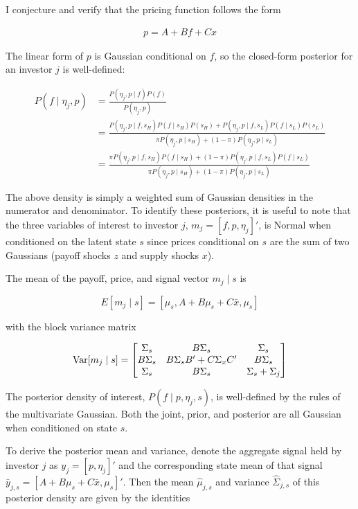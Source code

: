 \documentclass{article}
\begin{document}
I conjecture and verify that the pricing function follows the form

\begin{align}
    p = A + B f + C x
\end{align}

\noindent The linear form of $p$ is Gaussian conditional on $f$, so the closed-form posterior for an investor $j$ is well-defined:

\begin{align*}
    P(f \mid \eta_j, p) &= \frac{P(\eta_j, p \mid f) P(f)}{P(\eta_j, p)} \\
    &= \frac{P(\eta_j, p \mid f, s_H) P(f \mid s_H)P(s_H) + P(\eta_j, p \mid f, s_L) P(f \mid s_L)P(s_L)}{
        \pi P(\eta_j, p \mid s_H) + (1-\pi) P(\eta_j, p \mid s_L)}\\
    &= \frac{\pi P(\eta_j, p \mid f, s_H) P(f \mid s_H) + (1-\pi)P(\eta_j, p \mid f, s_L) P(f \mid s_L)}{
        \pi P(\eta_j, p \mid s_H) + (1-\pi) P(\eta_j, p \mid s_L)
    }
\end{align*}

\noindent The above density is simply a weighted sum of Gaussian densities in the numerator and denominator. To identify these posteriors, it is useful to note that the three variables of interest to investor $j$, $m_j = [f, p, \eta_j]'$, is Normal when conditioned on the latent state $s$ since prices conditional on $s$ are the sum of two Gaussians (payoff shocks $z$ and supply shocks $x$). 

The mean of the payoff, price, and signal vector $m_j \mid s$ is

$$
E[m_j \mid s] = [\mu_s, A + B\mu_s + C \bar x, \mu_s]
$$

\noindent with the block variance matrix

$$
\text{Var}[m_j \mid s] = \begin{bmatrix}
    \Sigma_s & B \Sigma_s & \Sigma_s \\
    B \Sigma_s & B\Sigma_s B' + C \Sigma_x C' & B \Sigma_s \\
    \Sigma_s & B \Sigma_s & \Sigma_s + \Sigma_j
\end{bmatrix}
$$

The posterior density of interest, $P(f \mid p, \eta_j, s)$, is well-defined by the rules of the multivariate Gaussian. Both the joint, prior, and posterior are all Gaussian when conditioned on state $s$.

To derive the posterior mean and variance, denote the aggregate signal held by investor $j$ as $y_j = [p, \eta_j]'$ and the corresponding state mean of that signal $\bar y_{j,s} = [A + B \mu_s + C \bar x, \mu_s]'$. Then the mean $\hat \mu_{j,s}$ and variance $\hat \Sigma_{j,s}$ of this posterior density are given by the identities
\end{document}
